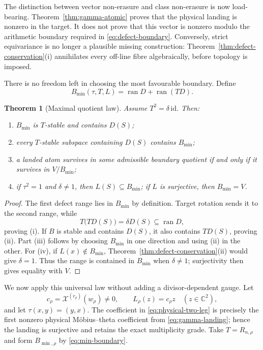 \documentclass[11pt]{article}
\newtheorem{theorem}{Theorem}[section]
\theoremstyle{definition}
\theoremstyle{remark}
\newcommand{\C}{\mathbb C}
\newcommand{\XiC}{\mathcal X}
\newcommand{\ran}{\operatorname{ran}}
\begin{document}
The distinction between vector non-erasure and class non-erasure is now
load-bearing.  Theorem~\ref{thm:gamma-atomic} proves that the physical
landing is nonzero in the target.  It does not prove that this vector is
nonzero modulo the arithmetic boundary required in
\eqref{eq:defect-boundary}.  Conversely, strict equivariance is no longer a
plausible missing construction: Theorem~\ref{thm:defect-conservation}(i)
annihilates every off-line fibre algebraically, before topology is imposed.

There is no freedom left in choosing the most favourable boundary.  Define
\[
 B_{\min}(\tau,T,L)=\ran D+\ran(TD).
\tag{6.7}\label{eq:min-boundary}
\]

\begin{theorem}[Maximal quotient law]
\label{thm:maximal-quotient}
Assume \(T^2=\delta\,\mathrm{id}\).  Then:
\begin{enumerate}[label=\textup{(\roman*)}]
\item \(B_{\min}\) is \(T\)-stable and contains \(D(S)\);
\item every \(T\)-stable subspace containing \(D(S)\) contains
      \(B_{\min}\);
\item a landed atom survives in some admissible boundary quotient if and
      only if it survives in \(V/B_{\min}\);
\item if \(\tau^2=1\) and \(\delta\neq1\), then
      \(L(S)\subseteq B_{\min}\); if \(L\) is surjective, then
      \(B_{\min}=V\).
\end{enumerate}
\end{theorem}

\begin{proof}
The first defect range lies in \(B_{\min}\) by definition.  Target rotation
sends it to the second range, while
\[
 T\bigl(TD(S)\bigr)=\delta D(S)\subseteq\ran D,
\]
proving (i).  If \(B\) is stable and contains \(D(S)\), it also contains
\(TD(S)\), proving (ii).  Part (iii) follows by choosing \(B_{\min}\) in one
direction and using (ii) in the other.  For (iv), if \(L(x)\notin B_{\min}\),
Theorem~\ref{thm:defect-conservation}(ii) would give \(\delta=1\).  Thus the
range is contained in \(B_{\min}\) when \(\delta\neq1\); surjectivity then
gives equality with \(V\).
\end{proof}

We now apply this universal law without adding a divisor-dependent gauge.
Let
\[
 c_\rho=\XiC^{(r_\rho)}(w_\rho)\neq0,
 \qquad
 L_\rho(z)=c_\rho z\quad(z\in\C^2),
\tag{6.8}\label{eq:physical-two-leg}
\]
and let \(\tau(x,y)=(y,x)\).  The coefficient in
\eqref{eq:physical-two-leg} is precisely the first nonzero physical
M\"obius--theta coefficient from \eqref{eq:gamma-landing}; hence the landing
is surjective and retains the exact multiplicity grade.  Take
\(T=R_{n,\rho}\) and form \(B_{\min,\rho}\) by
\eqref{eq:min-boundary}.
\end{document}
